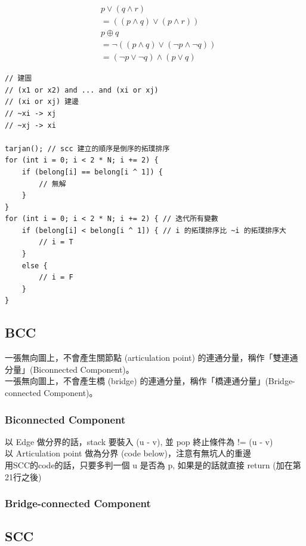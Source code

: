\documentclass[10pt,oneside]{article}
\begin{document}
\begin{landscape}
\begin{multicols}{2}
{\normalsize 
\begin{align*}
&p \lor (q \land r)  \\
&= ((p \land q) \lor (p \land r)) \\
&p \oplus q   \\
&= \lnot ( (p \land q) \lor (\lnot p \land \lnot q))     \\
&= (\lnot p \lor \lnot q) \land (p \lor q)    
\end{align*}
}

\begin{verbatim}
// 建圖
// (x1 or x2) and ... and (xi or xj)
// (xi or xj) 建邊
// ~xi -> xj
// ~xj -> xi

tarjan(); // scc 建立的順序是倒序的拓璞排序
for (int i = 0; i < 2 * N; i += 2) {
    if (belong[i] == belong[i ^ 1]) {
        // 無解
    }
}
for (int i = 0; i < 2 * N; i += 2) { // 迭代所有變數
    if (belong[i] < belong[i ^ 1]) { // i 的拓璞排序比 ~i 的拓璞排序大
        // i = T
    }
    else {
        // i = F
    }
}
\end{verbatim}

\subsection{BCC}

{\normalsize
一張無向圖上，不會產生關節點 (articulation point) 的連通分量，稱作「雙連通分量」(Biconnected Component)。\\
一張無向圖上，不會產生橋 (bridge) 的連通分量，稱作「橋連通分量」(Bridge-connected Component)。
}

\subsubsection{Biconnected Component }
{\normalsize 
    以 Edge 做分界的話，stack 要裝入 (u - v), 並 pop 終止條件為 != (u - v) \\
    以 Articulation point 做為分界 (code below)，注意有無坑人的重邊 \\
    
    用SCC的code的話，只要多判一個 u 是否為 p, 如果是的話就直接 return (加在第21行之後)
}

\subsubsection{Bridge-connected Component}

\subsection{SCC}


\end{multicols}
\end{landscape}
\end{document}
